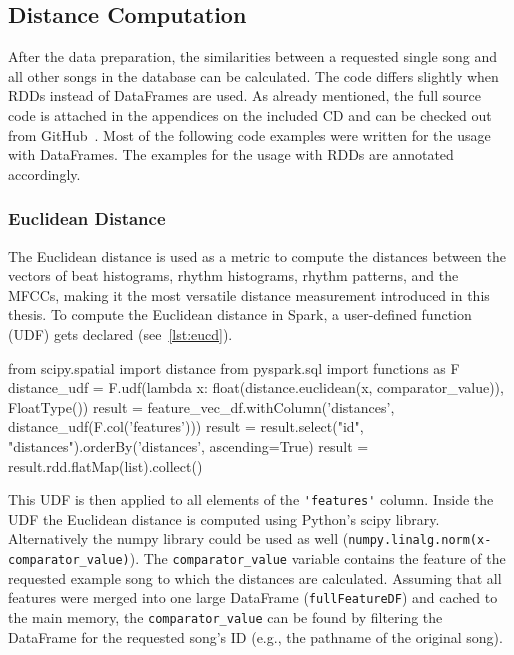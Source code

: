 \subsection{Distance Computation}

After the data preparation, the similarities between a requested single song and all other songs in the database can be calculated. The code differs slightly when RDDs instead of DataFrames are used. As already mentioned, the full source code is attached in the appendices on the included CD and can be checked out from GitHub~\cite{github-code}. Most of the following code examples were written for the usage with DataFrames. The examples for the usage with RDDs are annotated accordingly.\\

\subsubsection{Euclidean Distance}

The Euclidean distance is used as a metric to compute the distances between the vectors of beat histograms, rhythm histograms, rhythm patterns, and the MFCCs, making it the most versatile distance measurement introduced in this thesis. To compute the Euclidean distance in Spark, a user-defined function (UDF) gets declared (see~\ref{lst:eucd}). 

\begin{pythonCode}[frame=single,label={lst:eucd},caption={Euclidean distance DF},captionpos=b]
from scipy.spatial import distance
from pyspark.sql import functions as F
distance_udf = F.udf(lambda x: float(distance.euclidean(x, comparator_value)), FloatType())
result = feature_vec_df.withColumn('distances', distance_udf(F.col('features')))
result = result.select("id", "distances").orderBy('distances', ascending=True)
result = result.rdd.flatMap(list).collect()
\end{pythonCode}

\noindent This UDF is then applied to all elements of the \lstinline{'features'} column. Inside the UDF the Euclidean distance is computed using Python's scipy library. Alternatively the numpy library could be used as well (\lstinline{numpy.linalg.norm(x-comparator_value)}). The \lstinline{comparator_value} variable contains the feature of the requested example song to which the distances are calculated. Assuming that all features were merged into one large DataFrame (\lstinline{fullFeatureDF}) and cached to the main memory, the \lstinline{comparator_value} can be found by filtering the DataFrame for the requested song's ID (e.g., the pathname of the original song).

